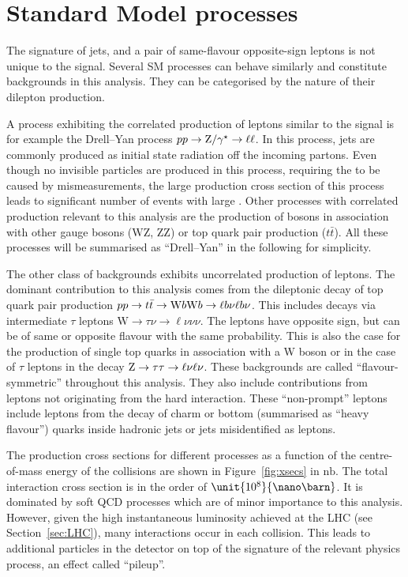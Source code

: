 \section{Standard Model processes}
\label{sec:SMBackgrounds}
The signature of jets, \MET and a pair of same-flavour opposite-sign leptons is not unique to the signal. Several SM processes can behave similarly and constitute backgrounds in this analysis. They can be categorised by the nature of their dilepton production. 

A process exhibiting the correlated production of leptons similar to the signal is for example the Drell--Yan process $pp \rightarrow \mathrm{Z}/\gamma^{\star}\rightarrow \ell\ell$. In this process, jets are commonly produced as initial state radiation off the incoming partons. Even though no invisible particles are produced in this process, requiring the \MET to be caused by mismeasurements, the large production cross section of this process leads to significant number of events with large \MET. Other processes with correlated production relevant to this analysis are the production of \Z bosons in association with other gauge bosons ($\mathrm{WZ}$, $\mathrm{ZZ}$) or top quark pair production ($t\bar{t}$\Z). All these processes will be summarised as ``Drell--Yan'' in the following for simplicity. 

The other class of backgrounds exhibits uncorrelated production of leptons. The dominant contribution to this analysis comes from the dileptonic decay of top quark pair production $pp\rightarrow t\bar{t} \rightarrow \mathrm{W} b \mathrm{W} b\rightarrow \ell b\nu \ell b \nu$. This includes decays via intermediate $\tau$ leptons $\text{W}\rightarrow \tau \nu \rightarrow \ell \nu \nu \nu$. The leptons have opposite sign, but can be of same or opposite flavour with the same probability. This is also the case for the production of single top quarks in association with a W boson or in the case of $\tau$ leptons in the decay $\mathrm{Z} \rightarrow \tau\tau \rightarrow \ell\nu\ell\nu$. These backgrounds are called ``flavour-symmetric'' throughout this analysis. They also include contributions from leptons not originating from the hard interaction. These ``non-prompt'' leptons include leptons from the decay of charm or bottom (summarised as ``heavy flavour'') quarks inside hadronic jets or jets misidentified as leptons.

The production cross sections for different processes as a function of the centre-of-mass energy of the collisions are shown in Figure~\ref{fig:xsecs} in $\mathrm{nb}$. The total interaction cross section is in the order of $\unit{10^{8}}{\nano\barn}$. It is dominated by soft QCD processes which are of minor importance to this analysis. However, given the high instantaneous luminosity achieved at the LHC (see Section~\ref{sec:LHC}), many interactions occur in each collision. This leads to additional particles in the detector on top of the signature of the relevant physics process, an effect called ``pileup''.

